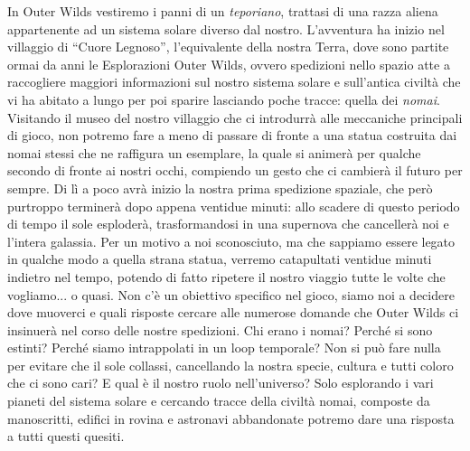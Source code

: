 \documentclass{book}
\theoremstyle{definition}
\theoremstyle{definition}
\theoremstyle{definition}
\theoremstyle{plain}
\theoremstyle{plain}
\theoremstyle{plain}
\theoremstyle{plain}
\begin{document}
In Outer Wilds vestiremo i panni di un \emph{teporiano}, trattasi di una razza aliena appartenente ad un sistema solare diverso dal nostro. L'avventura ha inizio nel villaggio di ``Cuore Legnoso'', l'equivalente della nostra Terra, dove sono partite ormai da anni le Esplorazioni Outer Wilds, ovvero spedizioni nello spazio atte a raccogliere maggiori informazioni sul nostro sistema solare e sull'antica civiltà che vi ha abitato a lungo per poi sparire lasciando poche tracce: quella dei \emph{nomai}. Visitando il museo del nostro villaggio che ci introdurrà alle meccaniche principali di gioco, non potremo fare a meno di passare di fronte a una statua costruita dai nomai stessi che ne raffigura un esemplare, la quale si animerà per qualche secondo di fronte ai nostri occhi, compiendo un gesto che ci cambierà il futuro per sempre.  Di lì a poco avrà inizio la nostra prima spedizione spaziale, che però purtroppo terminerà dopo appena ventidue minuti: allo scadere di questo periodo di tempo il sole esploderà, trasformandosi in una supernova che cancellerà noi e l'intera galassia. Per un motivo a noi sconosciuto, ma che sappiamo essere legato in qualche modo a quella strana statua, verremo catapultati ventidue minuti indietro nel tempo, potendo di fatto ripetere il nostro viaggio tutte le volte che vogliamo... o quasi. Non c'è un obiettivo specifico nel gioco, siamo noi a decidere dove muoverci e quali risposte cercare alle numerose domande che Outer Wilds ci insinuerà nel corso delle nostre spedizioni. Chi erano i nomai? Perché si sono estinti? Perché siamo intrappolati in un loop temporale? Non si può fare nulla per evitare che il sole collassi, cancellando la nostra specie, cultura e tutti coloro che ci sono cari? E qual è il nostro ruolo nell'universo? Solo esplorando i vari pianeti del sistema solare e cercando tracce della civiltà nomai, composte da manoscritti, edifici in rovina e astronavi abbandonate potremo dare una risposta a tutti questi quesiti.\\
\end{document}
